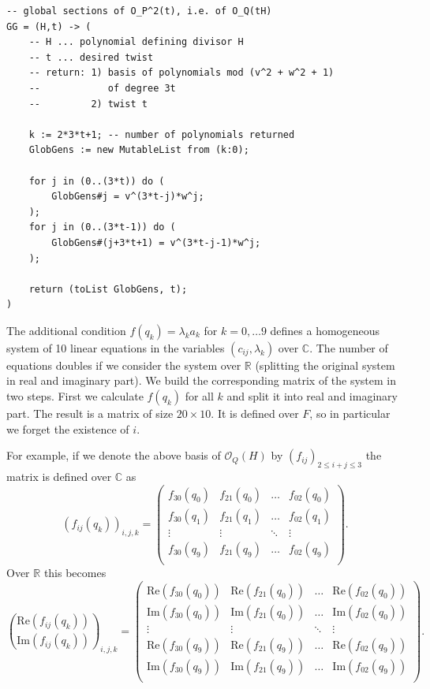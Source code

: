 \documentclass[a4paper,10pt]{amsart}
\theoremstyle{definition}
\theoremstyle{plain}
\newcommand{\cO}{{\mathcal O}}
\newcommand{\C}{{\mathbb C}}
\newcommand{\R}{{\mathbb R}}
\begin{document}
\begin{oframed}
\begin{verbatim}
-- global sections of O_P^2(t), i.e. of O_Q(tH)
GG = (H,t) -> (
    -- H ... polynomial defining divisor H
    -- t ... desired twist
    -- return: 1) basis of polynomials mod (v^2 + w^2 + 1)
    --            of degree 3t
    --         2) twist t

    k := 2*3*t+1; -- number of polynomials returned
    GlobGens := new MutableList from (k:0);
    
    for j in (0..(3*t)) do (
        GlobGens#j = v^(3*t-j)*w^j;
    );
    for j in (0..(3*t-1)) do (
        GlobGens#(j+3*t+1) = v^(3*t-j-1)*w^j;
    );
    
    return (toList GlobGens, t);
)
\end{verbatim}
\end{oframed}

The additional condition $f(q_k) = \lambda_k a_k$ for $k = 0, \dots 9$ defines a homogeneous system of 10 linear equations in the variables $(c_{ij}, \lambda_k)$ over $\C$. The number of equations doubles if we consider the system over $\R$ (splitting the original system in real and imaginary part). We build the corresponding matrix of the system in two steps. First we calculate $f(q_k)$ for all $k$ and split it into real and imaginary part. The result is a matrix of size $20 \times 10$. It is defined over $F$, so in particular we forget the existence of $i$.

For example, if we denote the above basis of $\cO_Q(H)$ by $(f_{ij})_{2 \leq i + j \leq 3}$ the matrix is defined over $\C$ as
\begin{equation*}
    (f_{ij}(q_k))_{i,j,k} = \begin{pmatrix}
        f_{30}(q_0) & f_{21}(q_0) & \dots & f_{02}(q_0) \\
        f_{30}(q_1) & f_{21}(q_1) & \dots & f_{02}(q_1) \\
        \vdots & \vdots & \ddots & \vdots \\
        f_{30}(q_9) & f_{21}(q_9) & \dots & f_{02}(q_9) \\
    \end{pmatrix}.
\end{equation*}
Over $\R$ this becomes
\begin{equation*}
    \binom{\text{Re}(f_{ij}(q_k))}{\text{Im}(f_{ij}(q_k))}_{i,j,k} = \begin{pmatrix}
        \text{Re}(f_{30}(q_0)) & \text{Re}(f_{21}(q_0)) & \dots & \text{Re}(f_{02}(q_0)) \\
        \text{Im}(f_{30}(q_0)) & \text{Im}(f_{21}(q_0)) & \dots & \text{Im}(f_{02}(q_0)) \\
        \vdots & \vdots & \ddots & \vdots \\
        \text{Re}(f_{30}(q_9)) & \text{Re}(f_{21}(q_9)) & \dots & \text{Re}(f_{02}(q_9)) \\
        \text{Im}(f_{30}(q_9)) & \text{Im}(f_{21}(q_9)) & \dots & \text{Im}(f_{02}(q_9)) \\
    \end{pmatrix}.
\end{equation*}
\end{document}
